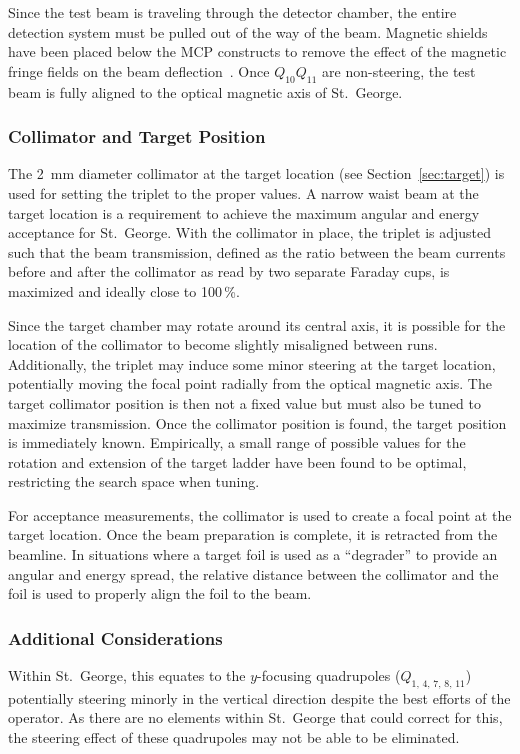 Since the test beam is traveling through the detector chamber, the
entire detection system must be pulled out of the way of the beam.
Magnetic shields have been placed below the MCP constructs to remove the
effect of the magnetic fringe fields on the beam
deflection~\cite{MoralesDNP}. Once $Q_{10}Q_{11}$ are non-steering, the
test beam is fully aligned to the optical magnetic axis of St.\ George.

\subsubsection{Collimator and Target Position}

The 2~mm diameter collimator at the target location (see
Section~\ref{sec:target}) is used for setting the triplet to the proper
values. A narrow waist beam at the target location is a requirement to
achieve the maximum angular and energy acceptance for St.\ George. With
the collimator in place, the triplet is adjusted such that the beam
transmission, defined as the ratio between the beam currents before and
after the collimator as read by two separate Faraday cups, is maximized
and ideally close to 100\,\%.

Since the target chamber may rotate around its central axis, it is
possible for the location of the collimator to become slightly
misaligned between runs. Additionally, the triplet may induce some minor
steering at the target location, potentially moving the focal point
radially from the optical magnetic axis. The target collimator position
is then not a fixed value but must also be tuned to maximize
transmission. Once the collimator position is found, the target position
is immediately known. Empirically, a small range of possible values for
the rotation and extension of the target ladder have been found to be
optimal, restricting the search space when tuning.

For acceptance measurements, the collimator is used to create a focal
point at the target location. Once the beam preparation is complete, it
is retracted from the beamline. In situations where a target foil is
used as a ``degrader'' to provide an angular and energy spread, the
relative distance between the collimator and the foil is used to
properly align the foil to the beam.

\subsubsection{Additional Considerations}
Within St.\ George, this equates to the
$y$-focusing quadrupoles ($Q_{1,\,4,\,7,\,8,\,11}$) potentially steering
minorly in the vertical direction despite the best efforts of the
operator. As there are no elements within St.\ George that could correct
for this, the steering effect of these quadrupoles may not be able to be
eliminated.

